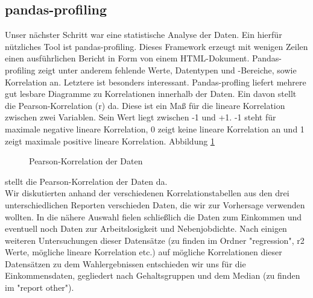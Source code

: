 \documentclass[a4paper,10pt]{scrartcl}
\begin{document}
\subsection{pandas-profiling}
Unser nächster Schritt war eine statistische Analyse der Daten. Ein hierfür nützliches Tool ist pandas-profiling. Dieses Framework erzeugt mit wenigen Zeilen einen ausführlichen Bericht in Form von einem HTML-Dokument. Pandas-profiling zeigt unter anderem fehlende Werte, Datentypen und -Bereiche, sowie Korrelation an. Letztere ist besonders interessant. Pandas-profling liefert mehrere gut lesbare Diagramme zu Korrelationen innerhalb der Daten. Ein davon stellt die Pearson-Korrelation (r) da. Diese ist ein Maß für die lineare Korrelation zwischen zwei Variablen. Sein Wert liegt zwischen -1 und +1. -1 steht für maximale negative lineare Korrelation, 0 zeigt keine lineare Korrelation an und 1 zeigt maximale positive lineare Korrelation. Abbildung \ref{fig:correlation}\begin{figure}
	\centering
	\caption{Pearson-Korrelation der Daten}
	\label{fig:correlation}
\end{figure}
 stellt die Pearson-Korrelation der Daten da.\\
 Wir diskutierten anhand der verschiedenen Korrelationstabellen aus den drei unterschiedlichen Reporten verschieden Daten, die wir zur Vorhersage verwenden wollten. In die nähere Auswahl fielen schließlich die Daten zum Einkommen und eventuell noch Daten zur Arbeitslosigkeit und Nebenjobdichte. Nach einigen weiteren Untersuchungen dieser Datensätze (zu finden im Ordner "regression", r2 Werte, mögliche lineare Korrelation etc.) auf mögliche Korrelationen dieser Datensätzen zu dem Wahlergebnissen entschieden wir uns für die Einkommensdaten, gegliedert nach Gehaltsgruppen und dem Median (zu finden im "report other").\\     
 
\end{document}
